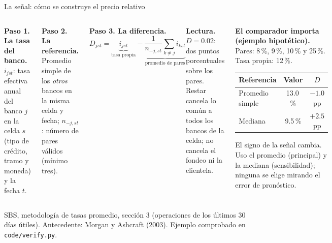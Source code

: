 \documentclass[aspectratio=169,10pt,t]{beamer}
\newcommand{\source}[1]{\par\vfill{\fontsize{6}{7.2}\selectfont\color{soft}#1\par}}
\begin{document}
\begin{frame}{La señal: cómo se construye el precio relativo}
\vspace{1.3mm}
\begin{columns}[T,onlytextwidth]
\small
\textbf{Paso 1. La tasa del banco.} $i_{jst}$: tasa efectiva anual del banco $j$
en la celda $s$ (tipo de crédito, tramo y moneda) y la fecha $t$.

\vspace{.8mm}
\textbf{Paso 2. La referencia.} Promedio simple de los \emph{otros} bancos en la
misma celda y fecha; $n_{-j,st}$: número de pares válidos (mínimo tres).

\vspace{.8mm}
\textbf{Paso 3. La diferencia.}
\vspace{-1.5mm}
\[
D_{jst}=\underbrace{i_{jst}}_{\text{tasa propia}}-
\underbrace{\frac{1}{n_{-j,st}}\sum_{k\neq j} i_{kst}}_{\text{promedio de pares}}
\]
\vspace{-3mm}

\textbf{Lectura.} $D=0.02$: dos puntos porcentuales sobre los pares. Restar cancela
lo común a todos los bancos de la celda; no cancela el fondeo ni la clientela.
\begin{plainbox}\small
\textbf{El comparador importa (ejemplo hipotético).}\\[.6mm]
Pares: 8\,\%, 9\,\%, 10\,\% y 25\,\%. Tasa propia: 12\,\%.
\vspace{.8mm}

\centering
\begin{tabular}{@{}lcc@{}}
\toprule Referencia & Valor & $D$\\\midrule
Promedio simple & 13.0\,\% & $-1.0$ pp\\
Mediana & 9.5\,\% & $+2.5$ pp\\\bottomrule
\end{tabular}
\vspace{.8mm}

\raggedright El signo de la señal cambia. Uso el promedio (principal) y la mediana
(sensibilidad); ninguna se elige mirando el error de pronóstico.
\end{plainbox}
\end{columns}
\source{SBS, metodología de tasas promedio, sección 3 (operaciones de los últimos 30
días útiles). Antecedente: Morgan y Ashcraft (2003). Ejemplo comprobado en
\texttt{code/verify.py}.}
\end{frame}

\end{document}
